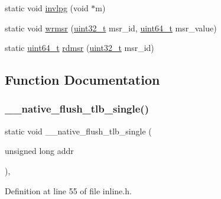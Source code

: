\begin{DoxyCompactItemize}
static void \hyperlink{a00104_a20faed26baa341152aa32288418f1457_a20faed26baa341152aa32288418f1457}{invlpg} (void $\ast$m)
\item 
static void \hyperlink{a00104_a368f08346121290f513a26011e0f68f8_a368f08346121290f513a26011e0f68f8}{wrmsr} (\hyperlink{a00095_a435d1572bf3f880d55459d9805097f62_a435d1572bf3f880d55459d9805097f62}{uint32\+\_\+t} msr\+\_\+id, \hyperlink{a00095_aa232ecf786a74ce5363c36c10798d2b1_aa232ecf786a74ce5363c36c10798d2b1}{uint64\+\_\+t} msr\+\_\+value)
\item 
static \hyperlink{a00095_aa232ecf786a74ce5363c36c10798d2b1_aa232ecf786a74ce5363c36c10798d2b1}{uint64\+\_\+t} \hyperlink{a00104_a6fa28502e33e305c4335fe3032dc7799_a6fa28502e33e305c4335fe3032dc7799}{rdmsr} (\hyperlink{a00095_a435d1572bf3f880d55459d9805097f62_a435d1572bf3f880d55459d9805097f62}{uint32\+\_\+t} msr\+\_\+id)
\end{DoxyCompactItemize}


\subsection{Function Documentation}
\mbox{\label{a00104_ad80d786594a109b21e30da4bf6f56a85_ad80d786594a109b21e30da4bf6f56a85}} 
\subsubsection{\texorpdfstring{\+\_\+\+\_\+native\+\_\+flush\+\_\+tlb\+\_\+single()}{\_\_native\_flush\_tlb\_single()}}
{\footnotesize\ttfamily static void \+\_\+\+\_\+native\+\_\+flush\+\_\+tlb\+\_\+single (\begin{DoxyParamCaption}\item[{unsigned long}]{addr }\end{DoxyParamCaption})\hspace{0.3cm}{\ttfamily [inline]}, {\ttfamily [static]}}



Definition at line 55 of file inline.\+h.


\mbox{\label{a00104_ae7df27a6150c6a020eead928af349b21_ae7df27a6150c6a020eead928af349b21}} 
